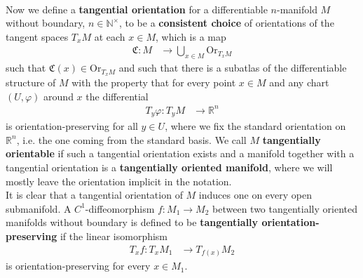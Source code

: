 \\
Now we define a \textbf{tangential orientation} for a differentiable $n$-manifold $M$ without boundary, $n \in \mathbb{N}^{\times}$, to be a \textbf{consistent choice} of orientations of the tangent spaces $T_{x}M$ at each $x \in M$, which is a map
\begin{align*}
  \mathfrak{C}
  \colon
  M
  &\to
  \bigcup_{x \in M}
  \mathrm{Or}_{T_{x}M}
\end{align*}
such that $\mathfrak{C}(x) \in \mathrm{Or}_{T_{x}M}$ and such that there is a subatlas of the differentiable structure of $M$ with the property that for every point $x \in M$ and any chart $(U,\varphi)$ around $x$ the differential
\begin{align*}
  T_{y}\varphi
  \colon
  T_{y}M
  &\to
  \mathbb{R}^{n}
\end{align*}
is orientation-preserving for all $y \in U$, where we fix the standard orientation on $\mathbb{R}^{n}$, i.e. the one coming from the standard basis. We call $M$ \textbf{tangentially orientable} if such a tangential orientation exists and a manifold together with a tangential orientation is a \textbf{tangentially oriented manifold}, where we will mostly leave the orientation implicit in the notation.
\\
It is clear that a tangential orientation of $M$ induces one on every open submanifold. A $C^{1}$-diffeomorphism $f \colon M_{1} \to M_{2}$ between two tangentially oriented manifolds without boundary is defined to be \textbf{tangentially orientation-preserving} if the linear isomorphism
\begin{align*}
  T_{x}f
  \colon
  T_{x}M_{1}
  &\to
  T_{f(x)}M_{2}
\end{align*}
is orientation-preserving for every $x \in M_{1}$.
\\
